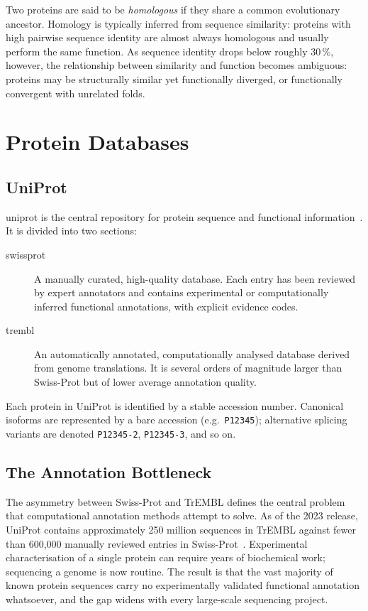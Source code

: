 Two proteins are said to be \textit{homologous} if they share a common
evolutionary ancestor. Homology is typically inferred from sequence similarity:
proteins with high pairwise sequence identity are almost always homologous and
usually perform the same function. As sequence identity drops below roughly
30\,\%, however, the relationship between similarity and function becomes
ambiguous: proteins may be structurally similar yet functionally diverged, or
functionally convergent with unrelated folds.

\section{Protein Databases}
\label{sec:databases}

\subsection{UniProt}
\label{subsec:uniprot}

\gls{uniprot} is the central repository for protein sequence and functional
information~\cite{uniprot2023}. It is divided into two sections:

\begin{description}
  \item[\gls{swissprot}] A manually curated, high-quality database. Each entry
    has been reviewed by expert annotators and contains experimental or
    computationally inferred functional annotations, with explicit evidence codes.
  \item[\gls{trembl}] An automatically annotated, computationally analysed
    database derived from genome translations. It is several orders of magnitude
    larger than Swiss-Prot but of lower average annotation quality.
\end{description}

Each protein in UniProt is identified by a stable accession number. Canonical
isoforms are represented by a bare accession (e.g.\ \texttt{P12345}); alternative
splicing variants are denoted \texttt{P12345-2}, \texttt{P12345-3}, and so on.

\subsection{The Annotation Bottleneck}
\label{subsec:annotation-bottleneck}

The asymmetry between Swiss-Prot and TrEMBL defines the central problem that
computational annotation methods attempt to solve. As of the 2023 release, UniProt
contains approximately 250 million sequences in TrEMBL against fewer than 600,000
manually reviewed entries in Swiss-Prot~\cite{uniprot2023}. Experimental
characterisation of a single protein can require years of biochemical work;
sequencing a genome is now routine. The result is that the vast majority of known
protein sequences carry no experimentally validated functional annotation
whatsoever, and the gap widens with every large-scale sequencing project.

